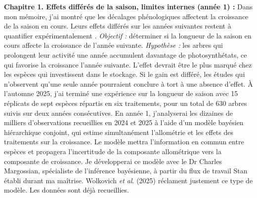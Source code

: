 \documentclass[12pt]{article}
\begin{document}
\textbf{Chapitre 1. Effets différés de la saison, limites internes (année 1) :}
Dans mon mémoire, j'ai montré que les décalages phénologiques affectent la croissance de la saison en cours. Leurs effets différés sur les années suivantes restent à quantifier expérimentalement \cite{chapin_ecology_1990,landhausser_partitioning_2012}. \textit{Objectif :} déterminer si la longueur de la saison en cours affecte la croissance de l'année suivante. \textit{Hypothèse :} les arbres qui prolongent leur activité une année accumulent davantage de photosynthétats, ce qui favorise la croissance l'année suivante. L'effet devrait être le plus marqué chez les espèces qui investissent dans le stockage. Si le gain est différé, les études qui n'observent qu'une seule année pourraient conclure à tort à une absence d'effet. À l'automne 2025, j'ai terminé une expérience sur la longueur de saison avec 15 réplicats de sept espèces répartis en six traitements, pour un total de 630 arbres suivis sur deux années consécutives. En année 1, j'analyserai les dizaines de milliers d'observations recueillies en 2024 et 2025 à l'aide d'un modèle bayésien hiérarchique conjoint, qui estime simultanément l'allométrie et les effets des traitements sur la croissance. Le modèle mettra l'information en commun entre espèces et propagera l'incertitude de la composante allométrique vers la composante de croissance. Je développerai ce modèle avec le Dr Charles Margossian, spécialiste de l'inférence bayésienne, à partir du flux de travail Stan établi durant ma maîtrise. Wolkovich \textit{et al}. (2025) réclament justement ce type de modèle. Les données sont déjà recueillies. \\
\end{document}
